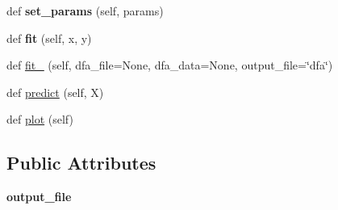 \begin{DoxyCompactItemize}
\item 
def {\bfseries set\+\_\+params} (self, params)\hypertarget{classflexfringe_1_1estimators_1_1_d_f_a_s_a_t_estimator_af60b24aef2956574069b231b73769ce1}{}\label{classflexfringe_1_1estimators_1_1_d_f_a_s_a_t_estimator_af60b24aef2956574069b231b73769ce1}

\item 
def {\bfseries fit} (self, x, y)\hypertarget{classflexfringe_1_1estimators_1_1_d_f_a_s_a_t_estimator_a0c8baa70692a96c59ccfb6b93646c8a4}{}\label{classflexfringe_1_1estimators_1_1_d_f_a_s_a_t_estimator_a0c8baa70692a96c59ccfb6b93646c8a4}

\item 
def \hyperlink{classflexfringe_1_1estimators_1_1_d_f_a_s_a_t_estimator_a6e504f1468b7f3617dac5c3552137f83}{fit\+\_\+} (self, dfa\+\_\+file=None, dfa\+\_\+data=None, output\+\_\+file=\char`\"{}dfa\char`\"{})
\item 
def \hyperlink{classflexfringe_1_1estimators_1_1_d_f_a_s_a_t_estimator_a0f3e5a09ad107352e7d0c92e1a19ae7d}{predict} (self, X)
\item 
def \hyperlink{classflexfringe_1_1estimators_1_1_d_f_a_s_a_t_estimator_aea42a1d82c30007acc257a4d4e587f12}{plot} (self)
\end{DoxyCompactItemize}
\subsection*{Public Attributes}
\begin{DoxyCompactItemize}
\item 
{\bfseries output\+\_\+file}\hypertarget{classflexfringe_1_1estimators_1_1_d_f_a_s_a_t_estimator_a024066dfad5255889ba4d6bb95c40f4c}{}\label{classflexfringe_1_1estimators_1_1_d_f_a_s_a_t_estimator_a024066dfad5255889ba4d6bb95c40f4c}

\end{DoxyCompactItemize}

